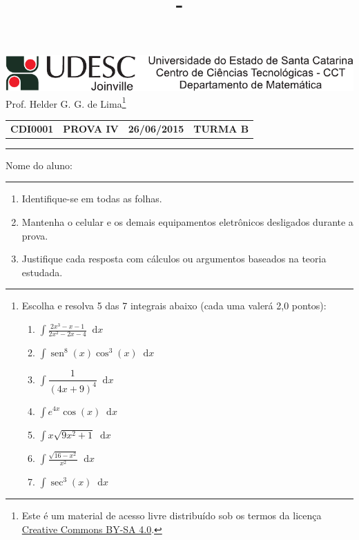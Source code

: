 \documentclass[12pt,a4paper]{article}
\author{\eu}
\title{\tipo - \disciplina}
\date{\data}
\newcommand{\fixme}{{\color{red}(...)}}
\newcommand*\tipo{PROVA IV}
\newcommand*\turma{TURMA B}
\newcommand*\disciplina{CDI0001}
\newcommand*\eu{Helder G. G. de Lima}
\newcommand*\data{26/06/2015}
\newcommand*\diff{\mathop{}\!\mathrm{d}}
\begin{document}
\thispagestyle{empty}
\begin{center}
\includegraphics{udesc_joinville_cabecalho.pdf}
\\ Prof. \eu\footnote{
Este é um material de acesso livre distribuído sob os termos da licença \href{https://creativecommons.org/licenses/by-sa/4.0/deed.pt_BR}{Creative Commons BY-SA 4.0}.}

\noindent\begin{tabular}{l c c r}
  \textbf{\disciplina}
& \textbf{\tipo}
& \textbf{\data}
& \textbf{\turma}
\end{tabular}\vspace{-0.3cm}
\noindent\rule{17cm}{0.01cm}
\end{center}

\noindent Nome do aluno: \rule{14cm}{0.01cm}

{\footnotesize
\begin{enumerate}
\renewcommand{\theenumi}{\Roman{enumi}}
\item Identifique-se em todas as folhas.
\item Mantenha o celular e os demais equipamentos eletrônicos desligados durante a prova.
\item Justifique cada resposta com cálculos ou argumentos baseados na teoria estudada.
\end{enumerate}
}
\noindent\rule{17cm}{0.01cm}
\begin{enumerate}
\item Escolha e resolva 5 das 7 integrais abaixo (cada uma valerá 2,0 pontos):
\begin{enumerate}
\item $\displaystyle\int \frac{2x^3-x-1}{2x^2-2x-4} \diff x$
\item $\displaystyle\int \operatorname{sen}^8(x) \cos^3(x) \diff x$
\item $\displaystyle\int \dfrac{1}{(4x+9)^4} \diff x$
\item $\displaystyle\int e^{4x} \cos(x) \diff x$
\item $\displaystyle\int x \sqrt{9x^2 + 1} \diff x$
\item $\displaystyle\int \frac{ \sqrt{16-x^2} }{x^2} \diff x$
\item $\displaystyle\int \sec^3(x) \diff x$
\end{enumerate}
\end{enumerate}

%
\end{document}
